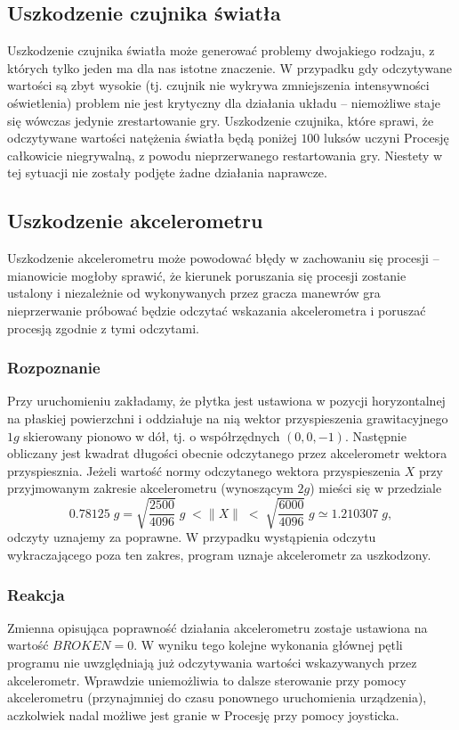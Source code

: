\documentclass[a4paper,12pt,twoside]{article}
\theoremstyle{plain}
\theoremstyle{definition}
\theoremstyle{remark}
\begin{document}
	\subsection{Uszkodzenie czujnika światła}
	Uszkodzenie czujnika światła może generować problemy dwojakiego rodzaju, z których tylko jeden ma dla nas istotne znaczenie. W przypadku gdy odczytywane wartości są zbyt wysokie (tj. czujnik nie wykrywa zmniejszenia intensywności oświetlenia) problem nie jest krytyczny dla działania układu -- niemożliwe staje się wówczas jedynie zrestartowanie gry. Uszkodzenie czujnika, które sprawi, że odczytywane wartości natężenia światła będą poniżej $100$ luksów uczyni Procesję całkowicie niegrywalną, z powodu nieprzerwanego restartowania gry. Niestety w tej sytuacji nie zostały podjęte żadne działania naprawcze.
		
	\subsection{Uszkodzenie akcelerometru}
	Uszkodzenie akcelerometru może powodować błędy w zachowaniu się procesji -- mianowicie mogłoby sprawić, że kierunek poruszania się procesji zostanie ustalony i niezależnie od wykonywanych przez gracza manewrów gra nieprzerwanie próbować będzie odczytać wskazania akcelerometra i poruszać procesją zgodnie z tymi odczytami.
	\subsubsection{Rozpoznanie}
	Przy uruchomieniu zakładamy, że płytka jest ustawiona w pozycji horyzontalnej na płaskiej powierzchni i oddziałuje na nią wektor przyspieszenia grawitacyjnego $1g$ skierowany pionowo w dół, tj. o współrzędnych $(0,0,-1)$. Następnie obliczany jest kwadrat długości obecnie odczytanego przez akcelerometr wektora przyspiesznia. Jeżeli wartość normy odczytanego wektora przyspieszenia $X$ przy przyjmowanym zakresie akcelerometru (wynoszącym $2g$) mieści się w przedziale
	$$0.78125\;g =\sqrt{ \frac{2500}{4096} }\; g \; < \| X \| \; < \; \sqrt{ \frac{6000}{4096} }\; g \simeq 1.210307\; g ,$$
	odczyty uznajemy za poprawne. W przypadku wystąpienia odczytu wykraczającego poza ten zakres, program uznaje akcelerometr za uszkodzony.
	\subsubsection{Reakcja}
	Zmienna opisująca poprawność działania akcelerometru zostaje ustawiona na wartość $BROKEN = 0$. W wyniku tego kolejne wykonania głównej pętli programu nie uwzględniają już odczytywania wartości wskazywanych przez akcelerometr. Wprawdzie uniemożliwia to dalsze sterowanie przy pomocy akcelerometru (przynajmniej do czasu ponownego uruchomienia urządzenia), aczkolwiek nadal możliwe jest granie w Procesję przy pomocy joysticka.
\end{document}
